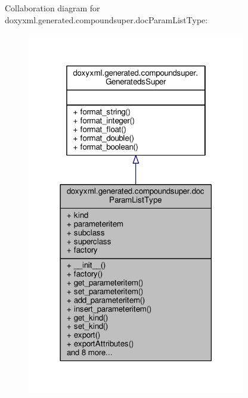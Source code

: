 Collaboration diagram for doxyxml.\+generated.\+compoundsuper.\+doc\+Param\+List\+Type\+:
\nopagebreak
\begin{figure}[H]
\begin{center}
\leavevmode
\includegraphics[width=270pt]{dd/d38/classdoxyxml_1_1generated_1_1compoundsuper_1_1docParamListType__coll__graph}
\end{center}
\end{figure}
